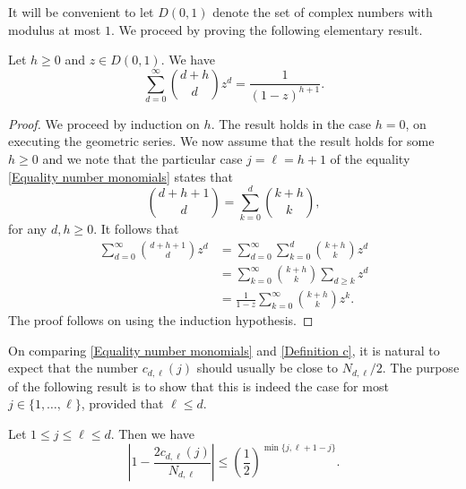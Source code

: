 \documentclass[11pt, reqno]{amsart}
\numberwithin{equation}{section}
\renewcommand{\leq}{\leqslant}
\renewcommand{\geq}{\geqslant}
\begin{document}
It will be convenient to let $D(0,1)$ denote the set of complex numbers with modulus at most $1$. We proceed by proving the following elementary result. 

\begin{lemma}
\label{Lemma series}
Let $h \geq 0$ and $z \in D(0,1)$. We have
\begin{equation*}
\sum_{d=0}^{\infty} \binom{d+h}{d} z^d = \frac1{(1-z)^{h+1}}.
\end{equation*}
\end{lemma}

\begin{proof}
We proceed by induction on $h$. The result holds in the case $h=0$, on executing the geometric series. 
We now assume that the result holds for some $h \geq 0$ and we note that the particular case $j = \ell = h+1$ of the equality \eqref{Equality number monomials} states that 
\begin{equation*}
\binom{d+h+1}{d} = \sum_{k=0}^d \binom{k+h}{k},
\end{equation*}
for any $d,h\geq 0$.
It follows that
\begin{align*}
\sum_{d=0}^{\infty} \binom{d+h+1}{d} z^d 
&=\sum_{d=0}^\infty \sum_{k=0}^{d} \binom{k+h}{k}z^d\\
&=\sum_{k=0}^\infty \binom{k+h}{k}
\sum_{d\geq k}
z^d\\
&=\frac{1}{1-z}\sum_{k=0}^\infty \binom{k+h}{k}
z^k.
\end{align*}
The proof follows on using the induction hypothesis.
\end{proof}


On comparing \eqref{Equality number monomials} and \eqref{Definition c}, 
it is natural to expect that the number $c_{d,\ell}(j)$ should usually be close to $N_{d,\ell}/2$. The  purpose of the following result is to show that this is indeed the case for most $j \in \{1, \dots, \ell\}$, provided 
that  $\ell \leq d$.


\begin{lemma}
\label{Lemma coefficients}
Let $1\leq j\leq \ell \leq d$. Then we have 
\begin{equation*}
\left|1- \frac{2c_{d,\ell}(j)}{N_{d,\ell}}\right|  \leq \left( \frac{1}{2} \right)^{\min \{ j, \ell+1-j \}}.
\end{equation*}
\end{lemma}
\end{document}
